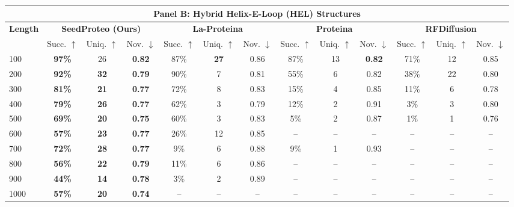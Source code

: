 \begin{table}[p]
{\begin{tabular}{l | ccc | ccc | ccc | ccc}
        \midrule
        \multicolumn{13}{c}{\large \textbf{Panel B: Hybrid Helix-E-Loop (HEL) Structures}} \\
        \midrule
        \multirow{2}{*}{\textbf{Length}} & \multicolumn{3}{c|}{\textbf{SeedProteo (Ours)}} & \multicolumn{3}{c|}{\textbf{La-Proteina}} & \multicolumn{3}{c|}{\textbf{Proteina}} & \multicolumn{3}{c}{\textbf{RFDiffusion}} \\
        \cmidrule(lr){2-4} \cmidrule(lr){5-7} \cmidrule(lr){8-10} \cmidrule(lr){11-13}
         & Succ. $\uparrow$ & Uniq. $\uparrow$ & Nov. $\downarrow$ & Succ. $\uparrow$ & Uniq. $\uparrow$ & Nov. $\downarrow$ & Succ. $\uparrow$ & Uniq. $\uparrow$ & Nov. $\downarrow$ & Succ. $\uparrow$ & Uniq. $\uparrow$ & Nov. $\downarrow$ \\
        \midrule
        100 & \textbf{97\%} & 26 & \textbf{0.82} & 87\% & \textbf{27} & 0.86 & 87\% & 13 & \textbf{0.82} & 71\% & 12 & 0.85 \\
        200 & \textbf{92\%} & \textbf{32} & \textbf{0.79} & 90\% & 7 & 0.81 & 55\% & 6 & 0.82 & 38\% & 22 & 0.80 \\
        300 & \textbf{81\%} & \textbf{21} & \textbf{0.77} & 72\% & 8 & 0.83 & 15\% & 4 & 0.85 & 11\% & 6 & 0.78 \\
        400 & \textbf{79\%} & \textbf{26} & \textbf{0.77} & 62\% & 3 & 0.79 & 12\% & 2 & 0.91 & 3\% & 3 & 0.80 \\
        500 & \textbf{69\%} & \textbf{20} & \textbf{0.75} & 60\% & 3 & 0.83 & 5\% & 2 & 0.87 & 1\% & 1 & 0.76 \\
        600 & \textbf{57\%} & \textbf{23} & \textbf{0.77} & 26\% & 12 & 0.85 & -- & -- & -- & -- & -- & -- \\
        700 & \textbf{72\%} & \textbf{28} & \textbf{0.77} & 9\% & 6 & 0.88 & 9\% & 1 & 0.93 & -- & -- & -- \\
        800 & \textbf{56\%} & \textbf{22} & \textbf{0.79} & 11\% & 6 & 0.86 & -- & -- & -- & -- & -- & -- \\
        900 & \textbf{44\%} & \textbf{14} & \textbf{0.78} & 3\% & 2 & 0.89 & -- & -- & -- & -- & -- & -- \\
        1000 & \textbf{57\%} & \textbf{20} & \textbf{0.74} & -- & -- & -- & -- & -- & -- & -- & -- & -- \\
        

\end{tabular}}
\end{table}
